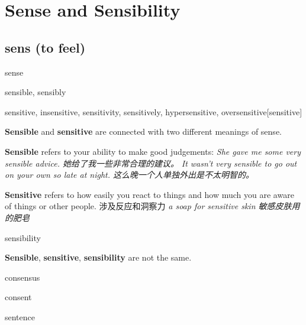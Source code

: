 \chapter{Sense and Sensibility}

\section{sens (to feel)}

\begin{DefWord}{sense}
\end{DefWord}

\begin{DefWord}{sensible, sensibly}
\end{DefWord}

\begin{DefWord}{sensitive, insensitive, sensitivity, sensitively, hypersensitive, oversensitive}[sensitive]
\end{DefWord}

\begin{remark}
    \textbf{Sensible} and \textbf{sensitive} are connected with two different meanings of sense.

    \textbf{Sensible} refers to your ability to make good judgements:
    \textit{She gave me some very sensible advice. 她给了我一些非常合理的建议。}
    \textit{It wasn't very sensible to go out on your own so late at night. 这么晚一个人单独外出是不太明智的。}

    \textbf{Sensitive} refers to how easily you react to things and how much you are aware of things or other people. 涉及反应和洞察力
    \textit{a soap for sensitive skin 敏感皮肤用的肥皂}
\end{remark}

\begin{DefWord}{sensibility}
\end{DefWord}

\begin{remark}
    \textbf{Sensible}, \textbf{sensitive}, \textbf{sensibility} are not the same.

    
\end{remark}

\begin{DefWord}{consensus}
\end{DefWord}

\begin{DefWord}{consent}
\end{DefWord}

\begin{DefWord}{sentence}
\end{DefWord}

